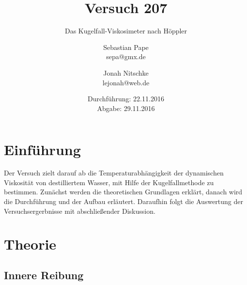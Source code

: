 

\title{Versuch 207}
\subtitle{Das Kugelfall-Viskosimeter nach Höppler}
\author{Sebastian Pape\\
        sepa@gmx.de \and
        Jonah Nitschke\\
        lejonah@web.de}
\date{Durchführung: 22.11.2016\\
      Abgabe: 29.11.2016}



\maketitle
\tableofcontents
\newpage

\section{Einführung}

Der Versuch zielt darauf ab die Temperaturabhängigkeit der dynamischen Viskosität von destilliertem
Wasser, mit Hilfe der Kugelfallmethode zu bestimmen. Zunächst werden die theoretischen Grundlagen
erklärt, danach wird die Durchführung und der Aufbau erläutert. Daraufhin folgt die Auswertung der Versuchsergerbnisse
mit abschließender Diskussion.

\section{Theorie}

\subsection{Innere Reibung}

